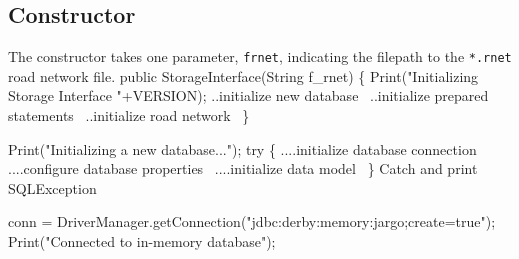 \documentclass{article}
\def\nwendcode{\endtrivlist \endgroup}
\let\nwdocspar=\par
\theoremstyle{definition}
\begin{document}
\subsection{Constructor}
\label{sec:constructor}
The constructor takes one parameter, {\tt{}f{}rnet}, indicating the filepath to the
{\tt{}*.rnet} road network file.
\nwenddocs{}\endmoddef{}
public StorageInterface(String f_rnet) \{
  Print("Initializing Storage Interface "+VERSION);
  \LA{}..initialize new database~{\nwtagstyle{}}\RA{}
  \LA{}..initialize prepared statements~{\nwtagstyle{}}\RA{}
  \LA{}..initialize road network~{\nwtagstyle{}}\RA{}
\}
\nwendcode{}\nwdocspar
\nwenddocs{}\endmoddef{}
Print("Initializing a new database...");
try \{
  \LA{}....initialize database connection~{\nwtagstyle{}}\RA{}
  \LA{}....configure database properties~{\nwtagstyle{}}\RA{}
  \LA{}....initialize data model~{\nwtagstyle{}}\RA{}
\}
\LA{}Catch and print \code{}SQLException\edoc{}~{\nwtagstyle{}}\RA{}
\nwendcode{}\nwdocspar
\nwenddocs{}\endmoddef{}
conn = DriverManager.getConnection("jdbc:derby:memory:jargo;create=true");
Print("Connected to in-memory database");
\nwendcode{}\nwdocspar
\end{document}
